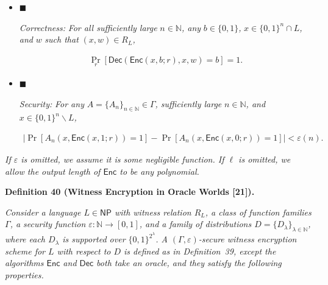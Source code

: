 \begin{itemize}


\item[] 
$\blacksquare$ 


\emph{Correctness:}\emph{ For all sufficiently large }$n\in\mathbb{N}$\emph{, any }$b\in\{0,1\}$\emph{, }$x\in\{0,1\}^{n}\cap L$\emph{, and }$w$\emph{ such that }$(x,w)\in R_{L}$\emph{,}\par


\[\begin{gathered}
\Pr_{r}\left[{\mathsf{Dec}}({\mathsf{Enc}}(x,b;r),x,w)=b\right]=1.
\end{gathered}\]





\item[] 
$\blacksquare$ 


\emph{Security:}\emph{ For any }$A=\{A_{n}\}_{n\in\mathbb{N}}\in\Gamma$\emph{, sufficiently large }$n\in\mathbb{N}$\emph{, and }$x\in\{0,1\}^{n}\backslash L$\emph{,}\par


\[\begin{gathered}
\left|\Pr[A_{n}(x,{\mathsf{Enc}}(x,1;r))=1]-\Pr[A_{n}(x,{\mathsf{Enc}}(x,0;r))=1]\right|<\varepsilon(n).
\end{gathered}\]





\end{itemize}


\emph{If $\varepsilon$ is omitted, we assume it is some negligible function. If $\ell$ is omitted, we allow the output length of ${\mathsf{Enc}}$ to be any polynomial.}\par







\par\medskip\noindent\textbf{
\textbf{Definition 40}\textbf{ }(Witness Encryption in Oracle Worlds [21])\textbf{.}
}\par



\emph{Consider a language $L\in{\mathsf{NP}}$ with witness relation $R_{L}$, a class of function families $\Gamma$, a security function $\varepsilon:\mathbb{N}\to[0,1]$, and a family of distributions $D=\{D_{\lambda}\}_{\lambda\in\mathbb{N}}$, where each $D_{\lambda}$ is supported over $\{0,1\}^{2^{\lambda}}$. A $(\Gamma,\varepsilon)$-secure witness encryption scheme for $L$ with respect to $D$ is defined as in Definition 39, except the algorithms ${\mathsf{Enc}}$ and ${\mathsf{Dec}}$ both take an oracle, and they satisfy the following properties.}\par


